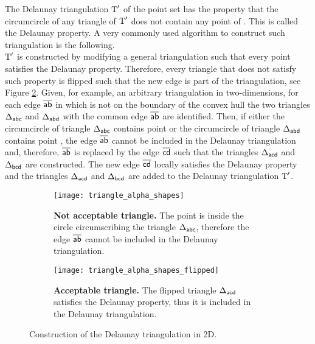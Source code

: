 The Delaunay triangulation $\mbox{$\textup{T}$}^{\prime}$ of the point set  has the property that the circumcircle of any triangle of $\mbox{$\textup{T}$}^{\prime}$ does not contain any point of . This is called the Delaunay property. A very commonly used algorithm to construct such triangulation is the following.\\ \indent 
$\mbox{$\textup{T}$}^\prime$ is constructed by modifying a general triangulation  such that every point satisfies the Delaunay property. 
Therefore, every triangle that does not satisfy such property is flipped such that the new edge is part of the triangulation, see Figure \ref{fig:Delaunay}. 
Given, for example, an arbitrary triangulation  in two-dimensions, for each edge $\overline{\textsf{ab}}$ in  which is not on the boundary of the convex hull the two triangles 
$\Delta_{\textsf{abc}}$ and $\Delta_{\textsf{abd}}$ with the common edge $\overline{\textsf{ab}}$ are identified. Then, if either the circumcircle of triangle $\Delta_{\textsf{abc}}$ contains point  or the circumcircle of triangle $\Delta_{\textsf{abd}}$ contains point , the edge $\overline{\textsf{ab}}$ cannot be included in the Delaunay triangulation and, therefore, $\overline{\textsf{ab}}$ is replaced by the edge $\overline{\textsf{cd}}$ such that the triangles $\Delta_{\textsf{acd}}$ and $\Delta_{\textsf{bcd}}$ are constructed. The new edge $\overline{\textsf{cd}}$ locally satisfies the Delaunay property and the triangles $\Delta_{\textsf{acd}}$ and  $\Delta_{\textsf{bcd}}$ are added to the Delaunay triangulation $\mbox{$\textup{T}$}^\prime$.  
\begin{figure}[t]\label{fig:Delaunay}
\begin{subfigure}[t]{0.48\textwidth}
\centering
\texttt{[image: triangle\_alpha\_shapes]}
\label{fig:shape}
\caption{\textbf{Not acceptable triangle.} The point  is inside the circle circumscribing the triangle $\Delta_{\textsf{abc}}$, therefore the edge $\overline{\textsf{ab}}$ cannot be included in the Delaunay triangulation.}
\end{subfigure}
\hfill
\begin{subfigure}[t]{0.48\textwidth}
\centering
\texttt{[image: triangle\_alpha\_shapes\_flipped]}
\caption{\textbf{Acceptable triangle.} The flipped triangle $\Delta_{\textsf{acd}}$ satisfies the Delaunay property, thus it is included in the Delaunay triangulation.}
\end{subfigure}
\caption{Construction of the Delaunay triangulation in 2D.}
\label{fig:Delaunay}
\end{figure}
